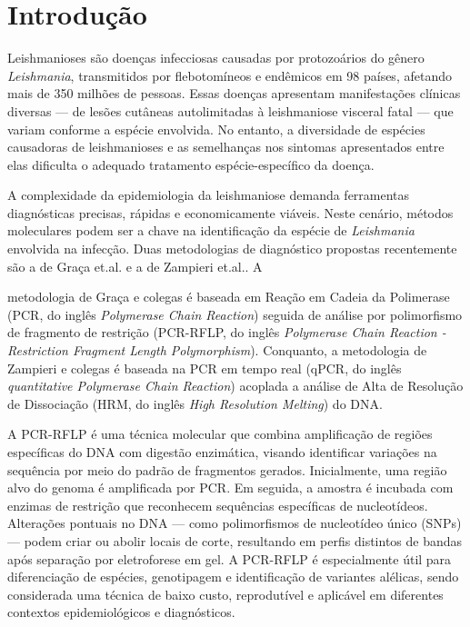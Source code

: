 \section{Introdução}

Leishmanioses são doenças infecciosas causadas por protozoários do gênero
\textit{Leishmania}, transmitidos por flebotomíneos e endêmicos em 98 países,
afetando mais de 350 milhões de pessoas\cite{hong2020one}. Essas doenças
apresentam manifestações clínicas diversas — de lesões cutâneas autolimitadas à
leishmaniose visceral fatal — que variam conforme a espécie envolvida. No
entanto, a diversidade de espécies causadoras de leishmanioses e as semelhanças
nos sintomas apresentados entre elas dificulta o adequado tratamento
espécie-específico da doença.

A complexidade da epidemiologia da leishmaniose demanda ferramentas diagnósticas
precisas, rápidas e economicamente viáveis.  Neste cenário, métodos moleculares
podem ser a chave na identificação da espécie de \textit{Leishmania} envolvida
na infecção. Duas metodologias de diagnóstico propostas recentemente são a de
Graça et.al.\cite{RFLPgraca2012} e a de Zampieri et.al.\cite{HRMzampi2016}.  A

metodologia de Graça e colegas é baseada em Reação em Cadeia da Polimerase (PCR,
do inglês \textit{Polymerase Chain Reaction}) seguida de análise por
polimorfismo de fragmento de restrição (PCR-RFLP, do inglês \textit{Polymerase
Chain Reaction - Restriction Fragment Length Polymorphism}). Conquanto, a
metodologia de Zampieri e colegas é baseada na PCR em tempo real (qPCR, do
inglês \textit{quantitative Polymerase Chain Reaction}) acoplada
a análise de Alta de Resolução de Dissociação (HRM, do inglês \textit{High
Resolution Melting}) do DNA. 

A PCR-RFLP é uma técnica molecular que combina amplificação de regiões
específicas do DNA com digestão enzimática, visando identificar variações na
sequência por meio do padrão de fragmentos gerados. Inicialmente, uma região
alvo do genoma é amplificada por PCR. Em seguida, a amostra é incubada com
enzimas de restrição que reconhecem sequências específicas de nucleotídeos.
Alterações pontuais no DNA — como polimorfismos de nucleotídeo único (SNPs) —
podem criar ou abolir locais de corte, resultando em perfis distintos de bandas
após separação por eletroforese em gel. A PCR-RFLP é especialmente útil para
diferenciação de espécies, genotipagem e identificação de variantes alélicas,
sendo considerada uma técnica de baixo custo, reprodutível e aplicável em
diferentes contextos epidemiológicos e diagnósticos\cite{garcia2005metodos}.

